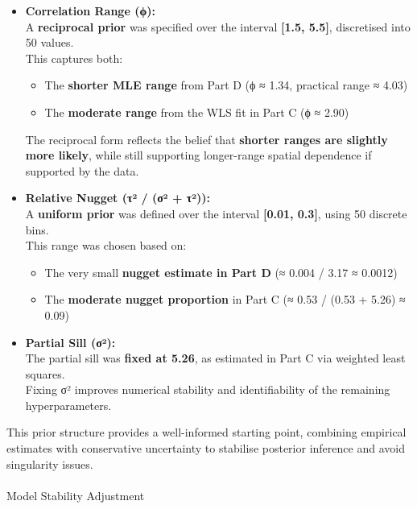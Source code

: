 \documentclass[
  11pt,
]{article}
\makeatletter
\let\oldparagraph\paragraph
\renewcommand{\paragraph}{
    \@ifstar
      \xxxParagraphStar
      \xxxParagraphNoStar
  }
\newcommand{\xxxParagraphStar}[1]{\oldparagraph*{#1}\mbox{}}
\newcommand{\xxxParagraphNoStar}[1]{\oldparagraph{#1}\mbox{}}
\makeatother
\begin{document}
\begin{itemize}
\item
  \textbf{Correlation Range (ϕ):}\\
  A \textbf{reciprocal prior} was specified over the interval
  \textbf{{[}1.5, 5.5{]}}, discretised into 50 values.\\
  This captures both:

  \begin{itemize}
  \item
    The \textbf{shorter MLE range} from Part D (ϕ ≈ 1.34, practical
    range ≈ 4.03)
  \item
    The \textbf{moderate range} from the WLS fit in Part C (ϕ ≈ 2.90)
  \end{itemize}

  The reciprocal form reflects the belief that \textbf{shorter ranges
  are slightly more likely}, while still supporting longer-range spatial
  dependence if supported by the data.
\item
  \textbf{Relative Nugget (τ² / (σ² + τ²)):}\\
  A \textbf{uniform prior} was defined over the interval
  \textbf{{[}0.01, 0.3{]}}, using 50 discrete bins.\\
  This range was chosen based on:

  \begin{itemize}
  \item
    The very small \textbf{nugget estimate in Part D} (≈ 0.004 / 3.17 ≈
    0.0012)
  \item
    The \textbf{moderate nugget proportion} in Part C (≈ 0.53 / (0.53 +
    5.26) ≈ 0.09)
  \end{itemize}
\item
  \textbf{Partial Sill (σ²):}\\
  The partial sill was \textbf{fixed at 5.26}, as estimated in Part C
  via weighted least squares.\\
  Fixing σ² improves numerical stability and identifiability of the
  remaining hyperparameters.
\end{itemize}

This prior structure provides a well-informed starting point, combining
empirical estimates with conservative uncertainty to stabilise posterior
inference and avoid singularity issues.

\paragraph{Model Stability Adjustment}\label{model-stability-adjustment}
\end{document}
